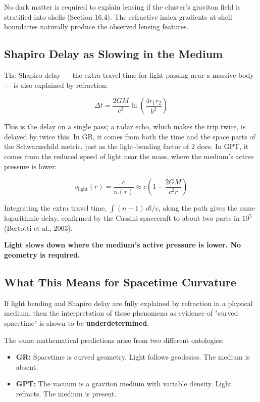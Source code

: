\documentclass[12pt, a4paper]{article}
\begin{document}
No dark matter is required to explain lensing if the cluster's graviton field is stratified into shells (Section 16.4). The refractive index gradients at shell boundaries naturally produce the observed lensing features.

\subsection{Shapiro Delay as Slowing in the Medium}
\label{subsec:shapiro_delay}

The Shapiro delay — the extra travel time for light passing near a massive body — is also explained by refraction:

\[
\Delta t = \frac{2GM}{c^3} \ln \left( \frac{4r_1 r_2}{b^2} \right)
\]

This is the delay on a single pass; a radar echo, which makes the trip twice, is delayed by twice this. In GR, it comes from both the time and the space parts of the Schwarzschild metric, just as the light-bending factor of 2 does. In GPT, it comes from the reduced speed of light near the mass, where the medium's active pressure is lower:

\[
v_{\text{light}}(r) = \frac{c}{n(r)} \approx c \left(1 - \frac{2GM}{c^2 r}\right)
\]

Integrating the extra travel time, \( \int (n-1)\,dl/c \), along the path gives the same logarithmic delay, confirmed by the Cassini spacecraft to about two parts in \( 10^5 \) (Bertotti et al., 2003).

\textbf{Light slows down where the medium's active pressure is lower. No geometry is required.}

\subsection{What This Means for Spacetime Curvature}
\label{subsec:curvature_meaning}

If light bending and Shapiro delay are fully explained by refraction in a physical medium, then the interpretation of these phenomena as evidence of "curved spacetime" is shown to be \textbf{underdetermined}.

The same mathematical predictions arise from two different ontologies:

\begin{itemize}
    \item \textbf{GR:} Spacetime is curved geometry. Light follows geodesics. The medium is absent.
    \item \textbf{GPT:} The vacuum is a graviton medium with variable density. Light refracts. The medium is present.
\end{itemize}
\end{document}
